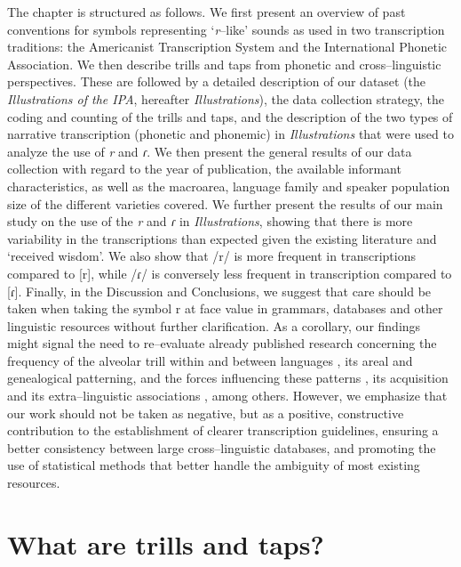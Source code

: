 The chapter is structured as follows. We first present an overview of past conventions for symbols representing ‘\textit{r}–like’ sounds as used in two transcription traditions: the Americanist Transcription System and the International Phonetic Association. We then describe trills and taps from phonetic and cross–linguistic perspectives. These are followed by a detailed description of our dataset (the \textit{Illustrations of the IPA}, hereafter \textit{Illustrations}), the data collection strategy, the coding and counting of the trills and taps, and the description of the two types of narrative transcription (phonetic and phonemic) in \textit{Illustrations} that were used to analyze the use of \textit{r} and \textit{ɾ}. We then present the general results of our data collection with regard  to the year of publication, the available informant characteristics, as well as the macroarea, language family and speaker population size of the different varieties covered. We further present the results of our main study on the use of the \textit{r} and \textit{ɾ} in \textit{Illustrations}, showing that there is more variability in the transcriptions than expected given the existing literature and ‘received wisdom’. We also show that /r/ is more frequent in transcriptions compared to [r], while /ɾ/ is conversely less frequent in transcription compared to [ɾ]. Finally, in the Discussion and Conclusions, we suggest that care should be taken when taking the symbol r at face value in grammars, databases and other linguistic resources without further clarification. As a corollary, our findings might signal the need to re–evaluate already published research concerning the frequency of the alveolar trill within and between languages \parencite{maddiesonPatternsSounds1984}, its areal and genealogical patterning, and the forces influencing these patterns \parencite{moranInferringRecentEvolutionary2021}, its acquisition \parencite{mcleodChildrenConsonantAcquisition2018,stembergerTapTrillClusters2018} and its extra–linguistic associations \parencite{winterTrilledAssociatedRoughness2022}, among others. However, we emphasize that our work should not be taken as negative, but as a positive, constructive contribution to the establishment of clearer transcription guidelines, ensuring a better consistency between  large cross–linguistic databases, and promoting the use of statistical methods that better handle the ambiguity of most existing resources.

\section{What are trills and taps?}

